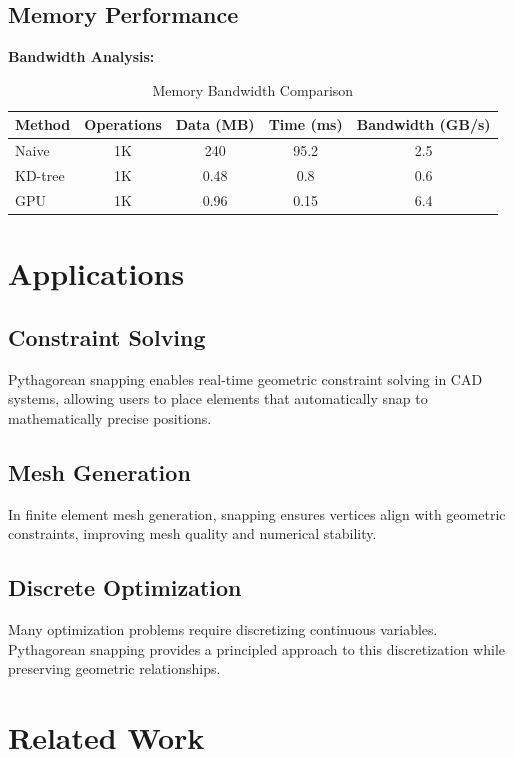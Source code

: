 \documentclass{article}
\begin{document}
\subsection{Memory Performance}

\textbf{Bandwidth Analysis:}
\begin{table}[h]
\centering
\begin{tabular}{lcccc}
\toprule
Method & Operations & Data (MB) & Time (ms) & Bandwidth (GB/s) \\
\midrule
Naive & 1K & 240 & 95.2 & 2.5 \\
KD-tree & 1K & 0.48 & 0.8 & 0.6 \\
GPU & 1K & 0.96 & 0.15 & 6.4 \\
\bottomrule
\end{tabular}
\caption{Memory Bandwidth Comparison}
\end{table}

\section{Applications}

\subsection{Constraint Solving}

Pythagorean snapping enables real-time geometric constraint solving in CAD systems, allowing users to place elements that automatically snap to mathematically precise positions.

\subsection{Mesh Generation}

In finite element mesh generation, snapping ensures vertices align with geometric constraints, improving mesh quality and numerical stability.

\subsection{Discrete Optimization}

Many optimization problems require discretizing continuous variables. Pythagorean snapping provides a principled approach to this discretization while preserving geometric relationships.

\section{Related Work}
\end{document}
